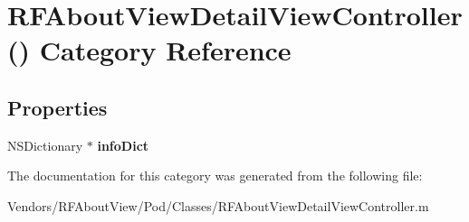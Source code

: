 \hypertarget{category_r_f_about_view_detail_view_controller_07_08}{}\section{R\+F\+About\+View\+Detail\+View\+Controller() Category Reference}
\label{category_r_f_about_view_detail_view_controller_07_08}
\subsection*{Properties}
\begin{DoxyCompactItemize}
\item 
\hypertarget{category_r_f_about_view_detail_view_controller_07_08_ad032ce9bdb434e94cbc321efbfbdb0f1}{}N\+S\+Dictionary $\ast$ {\bfseries info\+Dict}\label{category_r_f_about_view_detail_view_controller_07_08_ad032ce9bdb434e94cbc321efbfbdb0f1}

\end{DoxyCompactItemize}


The documentation for this category was generated from the following file\+:\begin{DoxyCompactItemize}
\item 
Vendors/\+R\+F\+About\+View/\+Pod/\+Classes/R\+F\+About\+View\+Detail\+View\+Controller.\+m\end{DoxyCompactItemize}
